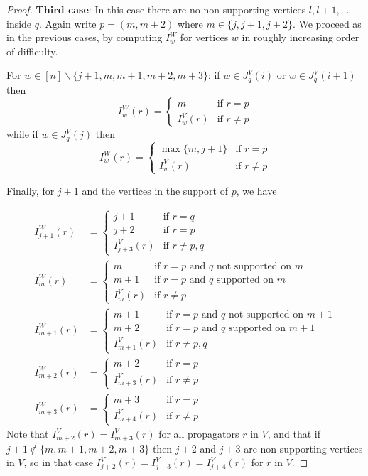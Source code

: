 \documentclass[11pt]{article}
\theoremstyle{remark}
\theoremstyle{definition}
\begin{document}
\begin{proof}
\textbf{Third case}: In this case there are no non-supporting vertices $l, l+1, \ldots$ inside $q$.  Again write $p=(m, m+2)$ where $m\in \{j, j+1, j+2\}$. We proceed as in the previous cases, by computing $I^{W}_w$ for vertices $w$ in roughly increasing order of difficulty.

For $w \in [n]\backslash\{j+1,m,m+1,m+2,m+3\}$: if $w\in J_q^{V}(i)$ or $w\in J_q^{V}(i+1)$ then
    \[
    I_w^{W}(r) =  \begin{cases}
        m & \text{if } r=p \\
        I_{w}^{V}(r) & \text{if } r\neq p
      \end{cases} 
    \]
    while if $w\in J_q^{V}(j)$ then
    \[
    I_w^{W}(r) =  \begin{cases}
        \max\{m, j+1\} & \text{if } r=p \\
        I_{w}^{V}(r) & \text{if } r\neq p
      \end{cases} 
    \]

Finally, for $j+1$ and the vertices in the support of $p$, we have

\begin{align*}
  I_{j+1}^{W}(r) &= \begin{cases}
    j+1 & \text{if } r=q\\
    j+2 & \text{if } r=p\\
    I_{j+3}^{V}(r) & \text{if } r\neq p,q
  \end{cases}\\
  I_m^{W}(r) &= \begin{cases}
    m & \text{if $r=p$ and $q$ not supported on $m$}\\
    m+1 & \text{if $r=p$ and $q$ supported on $m$}\\
    I_{m}^{V}(r) & \text{if } r\neq p
  \end{cases}\\
  I_{m+1}^{W}(r) & = \begin{cases}
    m+1 & \text{if $r=p$ and $q$ not supported on $m+1$} \\
    m+2 & \text{if $r=p$ and $q$ supported on $m+1$} \\
    I_{m+1}^{V}(r) & \text{if } r\neq p,q
  \end{cases}\\
  I_{m+2}^{W}(r) & = \begin{cases}
    m+2 & \text{if } r=p \\
    I_{m+3}^{V}(r) & \text{if } r\neq p
  \end{cases}\\
  I_{m+3}^{W}(r) & = \begin{cases}
    m+3 & \text{if } r=p \\
    I_{m+4}^{V}(r) & \text{if } r\neq p
  \end{cases}
\end{align*}
Note that $I_{m+2}^{V}(r) = I_{m+3}^{V}(r)$ for all propagators $r$ in $V$, and that if $j+1\not\in\{m, m+1, m+2, m+3\}$ then $j+2$ and $j+3$ are non-supporting vertices in $V$, so in that case $I_{j+2}^{V}(r) = I_{j+3}^{V}(r) = I_{j+4}^{V}(r)$ for $r$ in $V$. 


\end{proof}
\end{document}

